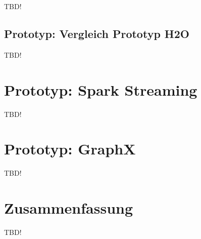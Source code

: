 TBD!

\subsection{Prototyp: Vergleich Prototyp H2O }
\label{section:vergleich h2o}

TBD!


\section{Prototyp: Spark Streaming }
\label{section:prototyp spark streaming}

TBD!



\section{Prototyp: GraphX}
\label{section:prototyp graphX}

TBD!




\section{Zusammenfassung}
\label{section:zusammen}



TBD!


